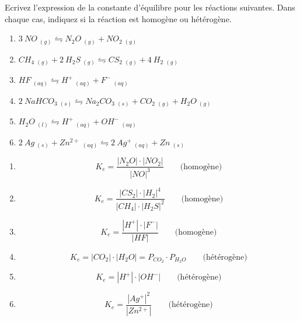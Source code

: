 \documentclass[
  11pt,
  french,
  a4paper,
  openany]{book}
\providecommand{\tightlist}{%
  \setlength{\itemsep}{0pt}\setlength{\parskip}{0pt}}
\begin{document}
\begin{Exercise}

Ecrivez l'expression de la constante d'équilibre pour les réactions suivantes. Dans chaque cas, indiquez si la réaction est homogène ou hétérogène.

\begin{enumerate}
\def\labelenumi{\arabic{enumi}.}
\tightlist
\item
  \(3\ NO\ _{(g)} \leftrightharpoons N_2O\ _{(g)} + NO_2\ _{(g)}\)
\item
  \(CH_4\ _{(g)} + 2\ H_2S\ _{(g)} \leftrightharpoons CS_2\ _{(g)} + 4\ H_2\ _{(g)}\)
\item
  \(HF\ _{(aq)} \leftrightharpoons H^+\ _{(aq)} + F^-\ _{(aq)}\)
\item
  \(2\ NaHCO_3\ _{(s)} \leftrightharpoons Na_2CO_3\ _{(s)} + CO_2\ _{(g)} + H_2O\ _{(g)}\)
\item
  \(H_2O\ _{(l)} \leftrightharpoons H^+\ _{(aq)} + OH^-\ _{(aq)}\)
\item
  \(2\ Ag\ _{(s)} + Zn^{2+}\ _{(aq)} \leftrightharpoons 2\ Ag^+\ _{(aq)} + Zn\ _{(s)}\)
\end{enumerate}


\end{Exercise}

\begin{Answer}

\begin{enumerate}
\def\labelenumi{\arabic{enumi}.}
\tightlist
\item
  \[ K_{e} = \frac{|N_2O| \cdot |NO_2|}{|NO|^{3}} \qquad \text{(homogène)} \]
\item
  \[ K_{e} = \frac{|CS_2| \cdot |H_2|^{4}}{|CH_4| \cdot |H_2S|^{2}} \qquad \text{(homogène)} \]
\item
  \[ K_{e} = \frac{|H^+| \cdot |F^-|}{|HF|} \qquad \text{(homogène)} \]
\item
  \[ K_{e} = |CO_2| \cdot |H_2O| = P_{CO_2} \cdot P_{H_2O} \qquad \text{(hétérogène)} \]
\item
  \[ K_{e} = |H^+| \cdot |OH^-| \qquad \text{(hétérogène)} \]
\item
  \[ K_{e} = \frac{|Ag^+|^{2}}{|Zn^{2+}|} \qquad \text{(hétérogène)} \]
\end{enumerate}

\clearpage


\end{Answer}
\end{document}
